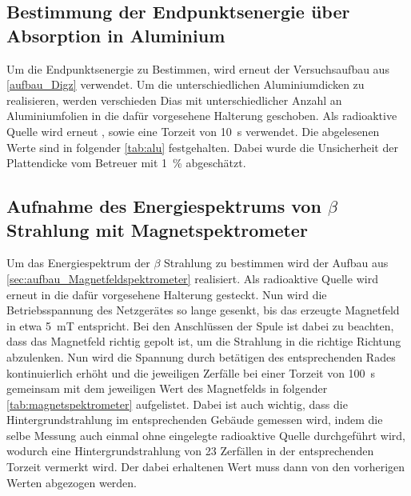 \documentclass[12pt,english,ngerman]{scrartcl}
\begin{document}
\subsection{Bestimmung der Endpunktsenergie über Absorption in Aluminium}

Um die Endpunktsenergie zu Bestimmen, wird erneut der Versuchsaufbau aus
\autoref{aufbau_Digz} verwendet. Um die unterschiedlichen Aluminiumdicken zu
realisieren, werden verschieden Dias mit unterschiedlicher Anzahl an
Aluminiumfolien in die dafür vorgesehene Halterung geschoben. Als radioaktive
Quelle wird erneut , sowie eine Torzeit von \SI{10}{\second}
verwendet. Die abgelesenen Werte sind in folgender \autoref{tab:alu}
festgehalten. Dabei wurde die Unsicherheit der Plattendicke vom Betreuer mit
\SI{1}{\percent} abgeschätzt.

\begin{table}[H]
	\caption[Erhaltene Zählraten bei $\beta$-Strahlung bei verschiedenen Dicken]
	{Erhaltene Zählraten bei $\beta$-Strahlung bei verschiedenen Dicken
		einer Aluminiumplatte bei
		einer Torzeit von \SI{10}{\second}. Dabei sind die Zählraten exakte Werte. \\
		\(D \dots\) Dicke der Aluminiumabschirmung in $\mu$m mit einer Unsicherheit von \SI{1}{\percent} \\
		\(z_{i} \dots\) erhaltene Zählrate bei entsprechendem Abstand}
	\label{tab:alu}
	\begin{center}
		
	\end{center}
\end{table}

\subsection{Aufnahme des Energiespektrums von \texorpdfstring{$\beta$}{beta} Strahlung mit Magnetspektrometer}

Um das Energiespektrum der \(\beta\) Strahlung zu bestimmen wird der Aufbau aus
\autoref{sec:aufbau_Magnetfeldspektrometer} realisiert. Als radioaktive Quelle
wird erneut  in die dafür vorgesehene Halterung gesteckt. Nun
wird die Betriebsspannung des Netzgerätes so lange gesenkt, bis das erzeugte
Magnetfeld in etwa \SI{5}{\milli\tesla} entspricht. Bei den Anschlüssen der
Spule ist dabei zu beachten, dass das Magnetfeld richtig gepolt ist, um die
Strahlung in die richtige Richtung abzulenken. Nun wird die Spannung durch
betätigen des entsprechenden Rades kontinuierlich erhöht und die jeweiligen
Zerfälle bei einer Torzeit von \SI{100}{\second} gemeinsam mit dem jeweiligen
Wert des Magnetfelds in folgender \autoref{tab:magnetspektrometer} aufgelistet.
Dabei ist auch wichtig, dass die Hintergrundstrahlung im entsprechenden Gebäude
gemessen wird, indem die selbe Messung auch einmal ohne eingelegte radioaktive
Quelle durchgeführt wird, wodurch eine Hintergrundstrahlung von 23 Zerfällen in
der entsprechenden Torzeit vermerkt wird. Der dabei erhaltenen Wert muss dann
von den vorherigen Werten abgezogen werden.
\end{document}
